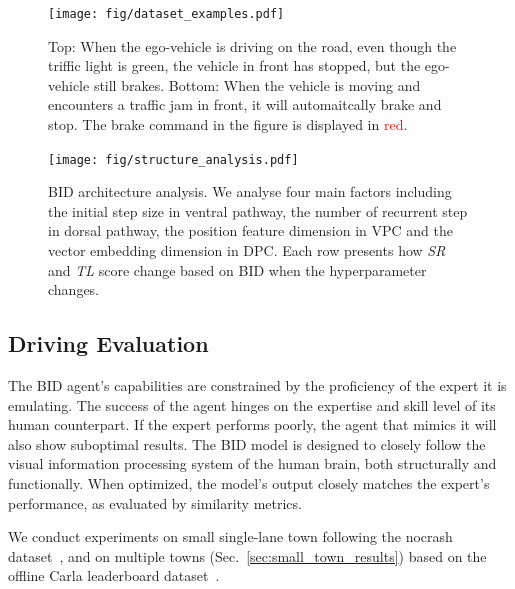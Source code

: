 \begin{figure}[t]
	\centering
	\texttt{[image: fig/dataset\_examples.pdf]}
	\caption{Top: When the ego-vehicle is driving on the road, even though the triffic light is green, the vehicle in front has stopped, but the ego-vehicle still brakes.
		Bottom: When the vehicle is moving and encounters a traffic jam in front, it will automaitcally brake and stop.
		The brake command in the figure is displayed in \textcolor{red}{red}.}
	\label{fig:command_ambiguous}
\end{figure}

\begin{figure}[ht!]
	\centering
	\texttt{[image: fig/structure\_analysis.pdf]}
	\caption{BID architecture analysis. 
		We analyse four main factors including the initial step size in ventral pathway, the number of recurrent step in dorsal pathway, the position feature dimension in VPC and the vector embedding dimension in DPC. 
		Each row presents how \emph{SR} and \emph{TL} score change based on BID when the hyperparameter changes. }
	\label{fig:structure_analysis}
\end{figure}

\subsection{Driving Evaluation}
\label{sec:Metrics}
\hspace{1pc}The BID agent's capabilities are constrained by the proficiency of the expert it is emulating. 
The success of the agent hinges on the expertise and skill level of its human counterpart.
If the expert performs poorly, the agent that mimics it will also show suboptimal results. 
The BID model is designed to closely follow the visual information processing system of the human brain, both structurally and functionally. 
When optimized, the model's output closely matches the expert's performance, as evaluated by similarity metrics.


We conduct experiments on small single-lane town following the nocrash dataset~\cite{Zhang:2021,Hu:2022}, and on multiple towns (Sec.~\ref{sec:small_town_results}) based on the offline Carla leaderboard dataset~\cite{Zhang:2021,Hu:2022}. 


